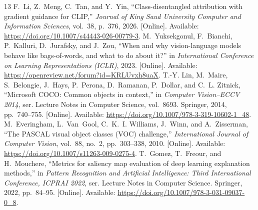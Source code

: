 \begin{thebibliography}{13}
F.~Li, Z.~Meng, C.~Tan, and Y.~Yin, ``Class-disentangled attribution with gradient
guidance for {CLIP},'' \emph{Journal of King Saud University Computer and
Information Sciences}, vol.~38, p.~376, 2026. [Online]. Available:
\url{https://doi.org/10.1007/s44443-026-00779-3}.
M.~Yuksekgonul, F.~Bianchi, P.~Kalluri, D.~Jurafsky, and J.~Zou, ``When and why
vision-language models behave like bags-of-words, and what to do about it?'' in
\emph{International Conference on Learning Representations (ICLR)}, 2023.
[Online]. Available: \url{https://openreview.net/forum?id=KRLUvxh8uaX}.
T.-Y. Lin, M.~Maire, S.~Belongie, J.~Hays, P.~Perona, D.~Ramanan, P.~Dollar,
and C.~L. Zitnick, ``Microsoft {COCO}: Common objects in context,'' in
\emph{Computer Vision--ECCV 2014}, ser. Lecture Notes in Computer Science,
vol.~8693. Springer, 2014, pp.~740--755. [Online]. Available:
\url{https://doi.org/10.1007/978-3-319-10602-1_48}.
M.~Everingham, L.~Van~Gool, C.~K.~I. Williams, J.~Winn, and A.~Zisserman,
``The {PASCAL} visual object classes ({VOC}) challenge,'' \emph{International
Journal of Computer Vision}, vol.~88, no.~2, pp.~303--338, 2010. [Online]. Available:
\url{https://doi.org/10.1007/s11263-009-0275-4}.
T.~Gomez, T.~Freour, and H.~Mouchere, ``Metrics for saliency map evaluation of
deep learning explanation methods,'' in \emph{Pattern Recognition and
Artificial Intelligence: Third International Conference, ICPRAI 2022}, ser.
Lecture Notes in Computer Science. Springer, 2022, pp.~84--95. [Online]. Available:
\url{https://doi.org/10.1007/978-3-031-09037-0_8}.
\end{thebibliography}

